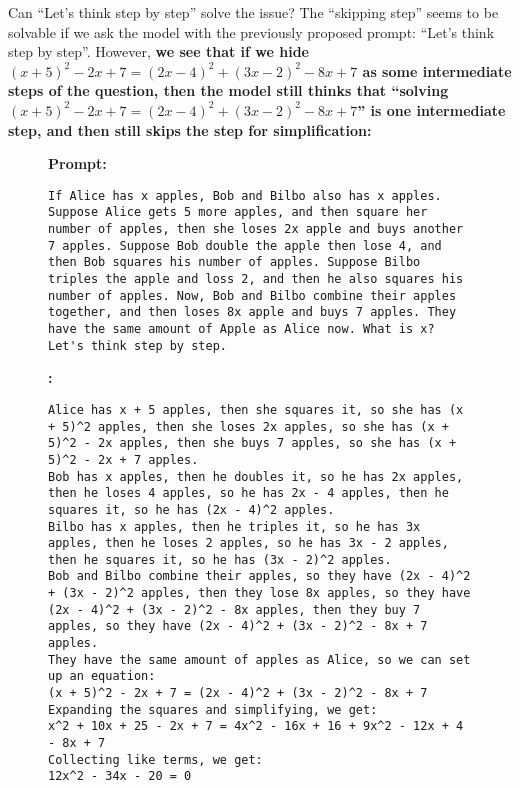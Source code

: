 {Can ``Let's think step by step'' solve the issue?} The ``skipping step'' seems to be solvable if we ask the model with the previously proposed prompt: ``Let's think step by step''. However, \textbf{we see that if we hide $(x + 5)^2 - 2x + 7 = (2x - 4)^2 + (3x - 2)^2 - 8x + 7$ as some intermediate steps of the question, then the model still thinks that ``solving $(x + 5)^2 - 2x + 7 = (2x - 4)^2 + (3x - 2)^2 - 8x + 7$'' is one intermediate step, and then still skips the step for simplification:}
\begin{figure}[H]
\begin{AIbox}{\DV}
{\bf Prompt:}
\begin{verbatim}
If Alice has x apples, Bob and Bilbo also has x apples. Suppose Alice gets 5 more apples, and then square her number of apples, then she loses 2x apple and buys another 7 apples. Suppose Bob double the apple then lose 4, and then Bob squares his number of apples. Suppose Bilbo triples the apple and loss 2, and then he also squares his number of apples. Now, Bob and Bilbo combine their apples together, and then loses 8x apple and buys 7 apples. They have the same amount of Apple as Alice now. What is x? 
Let's think step by step.
\end{verbatim}
{\bf\DV:}

\begin{verbatim}
Alice has x + 5 apples, then she squares it, so she has (x + 5)^2 apples, then she loses 2x apples, so she has (x + 5)^2 - 2x apples, then she buys 7 apples, so she has (x + 5)^2 - 2x + 7 apples.
Bob has x apples, then he doubles it, so he has 2x apples, then he loses 4 apples, so he has 2x - 4 apples, then he squares it, so he has (2x - 4)^2 apples.
Bilbo has x apples, then he triples it, so he has 3x apples, then he loses 2 apples, so he has 3x - 2 apples, then he squares it, so he has (3x - 2)^2 apples.
Bob and Bilbo combine their apples, so they have (2x - 4)^2 + (3x - 2)^2 apples, then they lose 8x apples, so they have (2x - 4)^2 + (3x - 2)^2 - 8x apples, then they buy 7 apples, so they have (2x - 4)^2 + (3x - 2)^2 - 8x + 7 apples.
They have the same amount of apples as Alice, so we can set up an equation:
(x + 5)^2 - 2x + 7 = (2x - 4)^2 + (3x - 2)^2 - 8x + 7
Expanding the squares and simplifying, we get:
x^2 + 10x + 25 - 2x + 7 = 4x^2 - 16x + 16 + 9x^2 - 12x + 4 - 8x + 7
Collecting like terms, we get:
12x^2 - 34x - 20 = 0
\end{verbatim}
\end{AIbox}
\end{figure}

